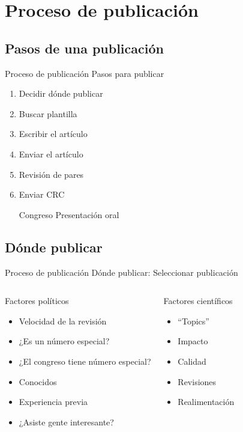 \documentclass{beamer}
\begin{document}
\section{Proceso de publicación}
\subsection[Pasos]{Pasos de una publicación}
\begin{frame}{Proceso de publicación} {Pasos para publicar}
	\begin{enumerate}
		\item Decidir dónde publicar
		\item Buscar plantilla
		\item Escribir el artículo
		\item Enviar el artículo
		\item Revisión de pares
		\item Enviar CRC
		\item [Congreso] Presentación oral
	\end{enumerate}
\end{frame}

\subsection{Dónde publicar}

\begin{frame}{Proceso de publicación} {Dónde publicar: Seleccionar publicación}
	\begin{columns}
	\begin{block}{Factores políticos}
	\begin{center}
	\begin{itemize}
		\item Velocidad de la revisión
		\item ¿Es un número especial?
		\item ¿El congreso tiene número especial?
		\item Conocidos
		\item Experiencia previa
		\item ¿Asiste gente interesante?
	\end{itemize}
	\end{center}
	\end{block}

	\begin{block}{Factores científicos}
  	\begin{center}
	\begin{itemize}
		\item ``Topics''
		\item \alert{Impacto}
		\item Calidad
		\item Revisiones
		\item Realimentación
	\end{itemize}
	\end{center}
	\end{block}
	\end{columns}
\end{frame}
\end{document}
